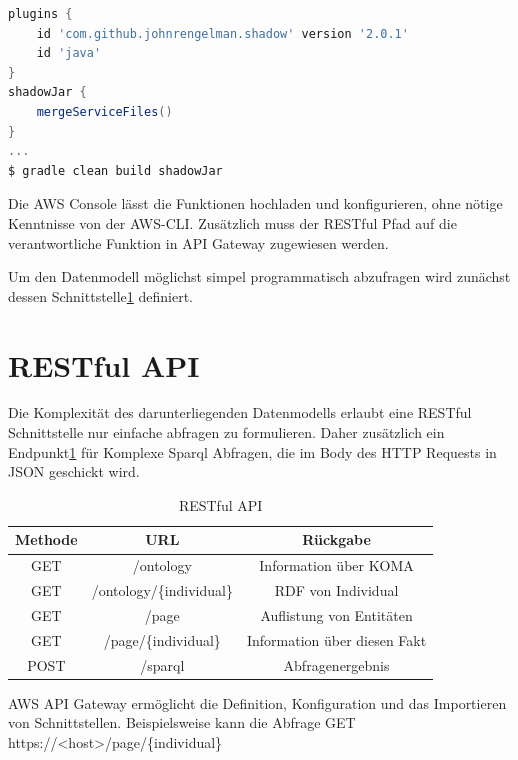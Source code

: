 \documentclass[
12pt,
english,
ngerman,
headsepline,
twoside,
openright,
numbers=noenddot,version=first
]{scrreprt}
\providecommand{\tabularnewline}{\\}
\begin{document}
\begin{lstlisting}[language=Groovy,caption={Abhängigkeitenverwaltung für Lambda in Java},label={lst:gradle}]
plugins {
	id 'com.github.johnrengelman.shadow' version '2.0.1'
	id 'java'
}
shadowJar {
	mergeServiceFiles()
}
...
$ gradle clean build shadowJar
\end{lstlisting}

Die AWS Console lässt die Funktionen hochladen und konfigurieren, ohne nötige Kenntnisse von der AWS-CLI. Zusätzlich muss der RESTful Pfad auf die verantwortliche Funktion in API Gateway zugewiesen werden. 


Um den Datenmodell möglichst simpel programmatisch abzufragen wird zunächst dessen Schnittstelle\ref{sec:rest} definiert. 

\section{RESTful API}
\label{sec:rest}

Die Komplexität des darunterliegenden Datenmodells erlaubt eine RESTful\cite{Hunter2017} Schnittstelle nur einfache abfragen zu formulieren. Daher zusätzlich ein Endpunkt\ref{tab:rest} für Komplexe Sparql Abfragen, die im Body des HTTP Requests in JSON geschickt wird. 

\begin{table}[H]
	\caption{RESTful API}\label{tab:rest}
	\noindent 
	\centering{}
	\begin{tabular}{ccc}
		\hline
		\noalign{\vskip\doublerulesep}
		Methode & URL & Rückgabe\tabularnewline[\doublerulesep]
		\hline
		\noalign{\vskip\doublerulesep}
		GET & /ontology & Information über KOMA
		\tabularnewline[\doublerulesep]\noalign{\vskip\doublerulesep}
		\noalign{\vskip\doublerulesep}
		GET & /ontology/\{individual\} & RDF von Individual
		\tabularnewline[\doublerulesep]\noalign{\vskip\doublerulesep}
		GET & /page & Auflistung von Entitäten 
		\tabularnewline[\doublerulesep]\noalign{\vskip\doublerulesep}
		GET & /page/\{individual\} & Information über diesen Fakt
		\tabularnewline[\doublerulesep]\noalign{\vskip\doublerulesep}
		POST & /sparql & Abfragenergebnis
		
	\end{tabular}
\end{table}

AWS API Gateway ermöglicht die Definition, Konfiguration und das Importieren von Schnittstellen. Beispielsweise kann die Abfrage GET https://<host>/page/\{individual\} 
\end{document}
